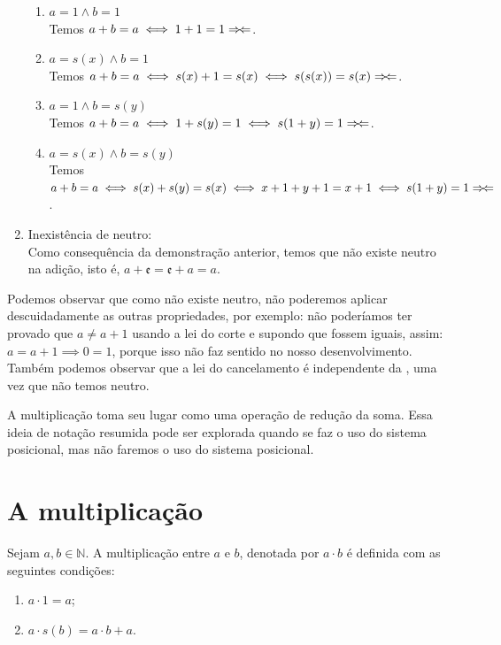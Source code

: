 \documentclass[../main.tex]{subfiles}
\begin{document}
\begin{dem}
\begin{enumerate}[label=(\roman*)]
\begin{enumerate}[label=(\arabic*)]
            \item $a=1 \land b=1$ \\
                Temos $a+b=a \iff 1+1=1 \Rightarrow\!\Leftarrow$. 
            \item $a=s(x) \land b=1$ \\
                Temos $a+b=a \iff s(x) + 1 = s(x) \iff s(s(x)) = s(x) \Rightarrow\!\Leftarrow$. 
            \item $a=1 \land b=s(y)$ \\
                Temos $a+b=a \iff 1+ s(y) = 1 \iff s(1+y) = 1 \Rightarrow\!\Leftarrow$. 
            \item $a=s(x) \land b=s(y)$ \\
                Temos $a+b=a \iff s(x) + s(y) = s(x) \iff x + 1 + y + 1 = x + 1 \iff s(1 + y) = 1 \Rightarrow\!\Leftarrow$.
            \end{enumerate}
    
        \item Inexistência de neutro: \\
            Como consequência da demonstração anterior, temos que não existe neutro na adição, isto é, $a + \mathfrak{e} = \mathfrak{e} + a = a$.
    \end{enumerate}
\end{dem}
 
Podemos observar que como não existe neutro, não poderemos aplicar descuidadamente as outras propriedades, por exemplo: não poderíamos ter provado que $a \neq a + 1 $ usando a lei do corte e supondo que fossem iguais, assim: $a = a+ 1 \implies 0 = 1$, porque isso não faz sentido no nosso desenvolvimento. Também podemos observar que a lei do cancelamento é independente da , uma vez que não temos neutro.

A multiplicação toma seu lugar como uma operação de redução da soma. Essa ideia de notação resumida pode ser explorada quando se faz o uso do sistema posicional, mas não faremos o uso do sistema posicional. 

\section{A multiplicação}
\begin{defi}\label{nat-def-multiplicacao}
    Sejam $a, b \in \mathbb{N}$. A multiplicação entre $a$ e $b$, denotada por $a \cdot b$ é definida com as seguintes condições: 
	\begin{enumerate}[label=(\roman*)]
		\item $a \cdot 1 = a$;
		\item $a \cdot s(b) = a \cdot b + a$.
	\end{enumerate}
\end{defi}
\end{document}
